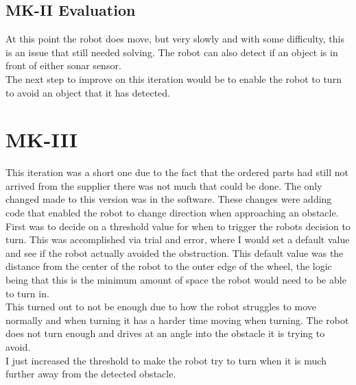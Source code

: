 \subsection{MK-II Evaluation}
At this point the robot does move, but very slowly and with some difficulty, this is an issue that still needed solving. The robot can also detect if an object is in front of either sonar sensor.
\\The next step to improve on this iteration would be to enable the robot to turn to avoid an object that it has detected.
\section{MK-III}
This iteration was a short one due to the fact that the ordered parts had still not arrived from the supplier there was not much that could be done.  The only changed made to this version was in the software.  These changes were adding code that enabled the robot to change direction when approaching an obstacle.
First was to decide on a threshold value for when to trigger the robots decision to turn.  This was accomplished via trial and error, where I would set a default value and see if the robot actually avoided the obstruction.  This default value was the distance from the center of the robot to the outer edge of the wheel, the logic being that this is the minimum amount of space the robot would need to be able to turn in.
\\This turned out to not be enough due to how the robot struggles to move normally and when turning it has a harder time moving when turning.  The robot does not turn enough and drives at an angle into the obstacle it is trying to avoid.
\\I just increased the threshold to make the robot try to turn when it is much further away from the detected obstacle.
